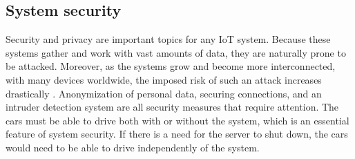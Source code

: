 \subsection{System security}
Security and privacy are important topics for any IoT system. Because these systems gather and work with vast amounts of data, they are naturally prone to be attacked. Moreover, as the systems grow and become more interconnected, with many devices worldwide, the imposed risk of such an attack increases drastically \parencite{iot_risk}. Anonymization of personal data, securing connections, and an intruder detection system are all security measures that require attention. The cars must be able to drive both with or without the system, which is an essential feature of system security. If there is a need for the server to shut down, the cars would need to be able to drive independently of the system.